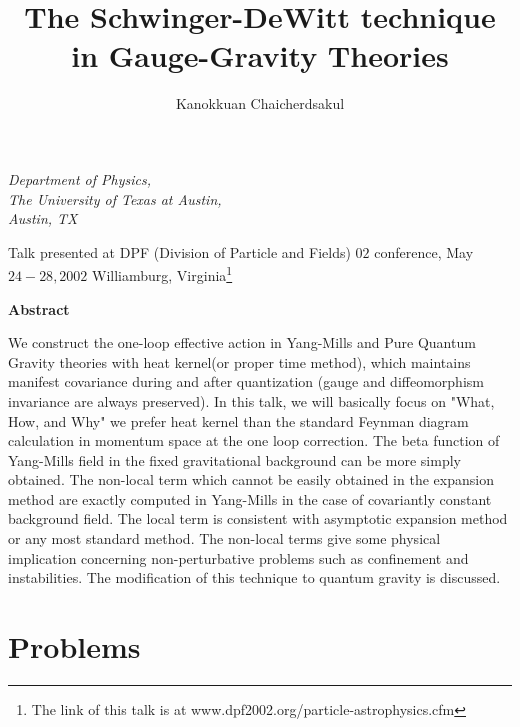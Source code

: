 \documentclass[a4paper,12 pt]{article}
\begin{document}
\title{The Schwinger-DeWitt technique in Gauge-Gravity
Theories} \maketitle
\begin{center}
\author{Kanokkuan Chaicherdsakul}

\emph{Department of Physics, \\The University of Texas at Austin,
\\Austin, TX}

\end{center}

 Talk
presented at DPF (Division of Particle and Fields) $02$
conference, May $24-28,2002$ Williamburg, Virginia\footnote{The
link of this talk is at www.dpf2002.org/particle-astrophysics.cfm}



\begin{center} \textbf{Abstract}\end{center}
We construct the one-loop effective action in Yang-Mills and Pure
Quantum Gravity theories with heat kernel(or proper time method),
which maintains manifest covariance during and after quantization
(gauge and diffeomorphism invariance are always preserved).  In
this talk, we will basically focus on "What, How, and Why" we
prefer heat kernel than the standard Feynman diagram calculation
in momentum space at the one loop correction. The beta function of
Yang-Mills field in the fixed gravitational background can be more
simply obtained. The non-local term which cannot be easily
obtained in the expansion method are exactly computed in
Yang-Mills in the case of covariantly constant background field.
The local term is consistent with asymptotic expansion method or
any most standard method. The non-local terms give some physical
implication concerning non-perturbative problems such as
confinement and instabilities. The modification of this technique
to quantum gravity is discussed.

\section{Problems}
\end{document}
